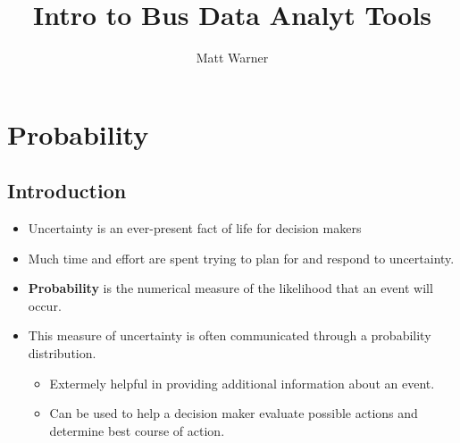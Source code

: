 \documentclass{report}
\title{\Huge{Intro to Bus Data Analyt Tools}}
\author{\huge{Matt Warner}}
\date{\huge{}}
\begin{document}
  \maketitle
  \newpage
  \chapter{Probability}
  \section{Introduction}
  \begin{itemize}
    \item Uncertainty is an ever-present fact of life for decision makers 
  \item Much time and effort are spent trying to plan for and respond to uncertainty.
  \item \textbf{Probability} is the numerical measure of the likelihood that an event will occur.
  \item This measure of uncertainty is often communicated through a probability distribution.
    \begin{itemize}[label=$\circ$]
    \item Extermely helpful in providing additional information about an event.
    \item Can be used to help a decision maker evaluate possible actions and determine best course of action.
  \end{itemize}
  \end{itemize}
\end{document}
